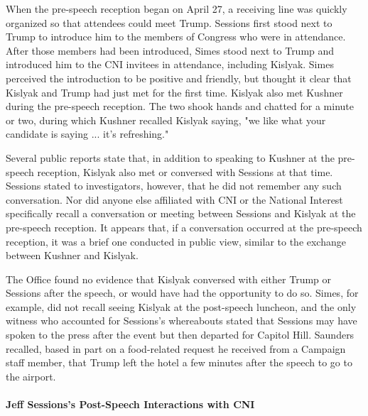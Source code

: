 When the pre-speech reception began on April 27, a receiving line was quickly organized so that attendees could meet Trump.%
Sessions first stood next to Trump to introduce him to the members of Congress who were in attendance.%
After those members had been introduced, Simes stood next to Trump and introduced him to the CNI invitees in attendance, including Kislyak.%
Simes perceived the introduction to be positive and friendly, but thought it clear that Kislyak and Trump had just met for the first time.%
Kislyak also met Kushner during the pre-speech reception.
The two shook hands and chatted for a minute or two, during which Kushner recalled Kislyak saying, "we like what your candidate is saying ... it's refreshing."%

Several public reports state that, in addition to speaking to Kushner at the pre-speech reception, Kislyak also met or conversed with Sessions at that time.%
Sessions stated to investigators, however, that he did not remember any such conversation.%
Nor did anyone else affiliated with CNI or the National Interest specifically recall a conversation or meeting between Sessions and Kislyak at the pre-speech reception.%
It appears that, if a conversation occurred at the pre-speech reception, it was a brief one conducted in public view, similar to the exchange between Kushner and Kislyak.

The Office found no evidence that Kislyak conversed with either Trump or Sessions after the speech, or would have had the opportunity to do so.
Simes, for example, did not recall seeing Kislyak at the post-speech luncheon,%
and the only witness who accounted for Sessions's whereabouts stated that Sessions may have spoken to the press after the event but then departed for Capitol Hill.%
Saunders recalled, based in part on a food-related request he received from a Campaign staff member, that Trump left the hotel a few minutes after the speech to go to the airport.%

\paragraph{Jeff Sessions's Post-Speech Interactions with CNI}

